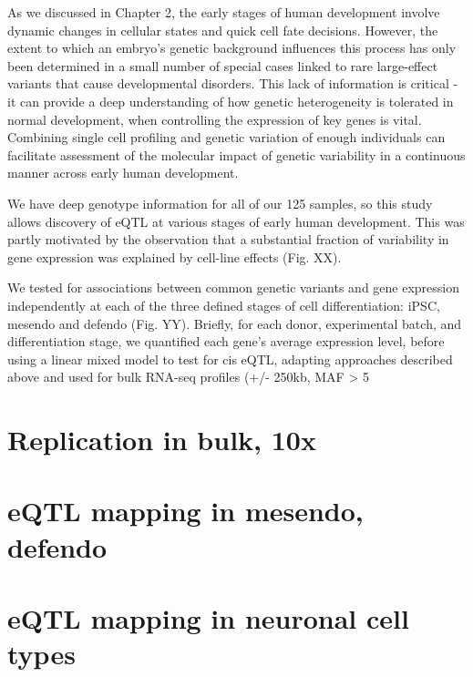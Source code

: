 As we discussed in Chapter 2, the early stages of human development involve dynamic changes in cellular states and quick cell fate decisions. However, the extent to which an embryo’s genetic background influences this process has only been determined in a small number of special cases linked to rare large-effect variants that cause developmental disorders. This lack of information is critical - it can provide a deep understanding of how genetic heterogeneity is tolerated in normal development, when controlling the expression of key genes is vital. Combining single cell profiling and genetic variation of enough individuals can facilitate assessment of the molecular impact of genetic variability in a continuous manner across early human development.
 
We have deep genotype information for all of our 125 samples, so this study allows discovery of eQTL at various stages of early human development. This was partly motivated by the observation that a substantial fraction of variability in gene expression was explained by cell-line effects (Fig. XX).
 
We tested for associations between common genetic variants and gene expression independently at each of the three defined stages of cell differentiation: iPSC, mesendo and defendo (Fig. YY). Briefly, for each donor, experimental batch, and differentiation stage, we quantified each gene’s average expression level, before using a linear mixed model to test for cis eQTL, adapting approaches described above and used for bulk RNA-seq profiles (+/- 250kb, MAF > 5%


\section{Replication in bulk, 10x}

\section{eQTL mapping in mesendo, defendo}

\section{eQTL mapping in neuronal cell types}

